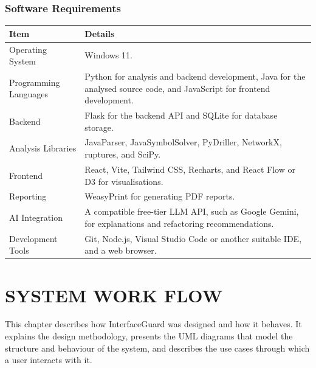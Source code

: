 \documentclass[12pt,a4paper]{article}
\begin{document}
\subsubsection{Software Requirements}

\begin{table}[htbp]
\centering
\label{tab:sw}
\renewcommand{\arraystretch}{1.4}
\setlength{\tabcolsep}{8pt}

\begin{tabular}{|L{1.6in}|L{3.75in}|}
\hline
\textbf{Item} & \textbf{Details} \\
\hline
Operating System & Windows 11. \\
\hline
Programming Languages & Python for analysis and backend development, Java for the analysed source code, and JavaScript for frontend development. \\
\hline
Backend & Flask for the backend API and SQLite for database storage. \\
\hline
Analysis Libraries & JavaParser, JavaSymbolSolver, PyDriller, NetworkX, ruptures, and SciPy. \\
\hline
Frontend & React, Vite, Tailwind CSS, Recharts, and React Flow or D3 for visualisations. \\
\hline
Reporting & WeasyPrint for generating PDF reports. \\
\hline
AI Integration & A compatible free-tier LLM API, such as Google Gemini, for explanations and refactoring recommendations. \\
\hline
Development Tools & Git, Node.js, Visual Studio Code or another suitable IDE, and a web browser. \\
\hline
\end{tabular}
\end{table}

\clearpage

\section{SYSTEM WORK FLOW}

\begin{spacing}{1.5}
\justifying
This chapter describes how InterfaceGuard was designed and how it behaves.
It explains the design methodology, presents the UML diagrams that model
the structure and behaviour of the system, and describes the use cases
through which a user interacts with it.
\end{spacing}
\end{document}
